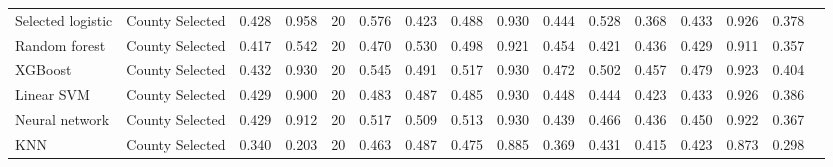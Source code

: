 \begin{table}[H]
{\begin{tabular}{lllccccccccccccc}
Selected logistic & County Selected & 0.428 & 0.958 & 20 & 0.576 & 0.423 & 0.488 & 0.930 & 0.444 & 0.528 & 0.368 & 0.433 & 0.926 & 0.378 \\
Random forest & County Selected & 0.417 & 0.542 & 20 & 0.470 & 0.530 & 0.498 & 0.921 & 0.454 & 0.421 & 0.436 & 0.429 & 0.911 & 0.357 \\
XGBoost & County Selected & 0.432 & 0.930 & 20 & 0.545 & 0.491 & 0.517 & 0.930 & 0.472 & 0.502 & 0.457 & 0.479 & 0.923 & 0.404 \\
Linear SVM & County Selected & 0.429 & 0.900 & 20 & 0.483 & 0.487 & 0.485 & 0.930 & 0.448 & 0.444 & 0.423 & 0.433 & 0.926 & 0.386 \\
Neural network & County Selected & 0.429 & 0.912 & 20 & 0.517 & 0.509 & 0.513 & 0.930 & 0.439 & 0.466 & 0.436 & 0.450 & 0.922 & 0.367 \\
KNN & County Selected & 0.340 & 0.203 & 20 & 0.463 & 0.487 & 0.475 & 0.885 & 0.369 & 0.431 & 0.415 & 0.423 & 0.873 & 0.298 \\
\bottomrule
\end{tabular}}
\end{table}
